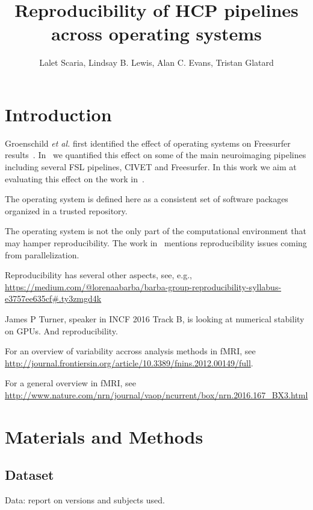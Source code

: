 \documentclass{article}
\title{Reproducibility of HCP pipelines across operating systems}
\author{Lalet Scaria, Lindsay B. Lewis, Alan C. Evans, Tristan Glatard}
\begin{document}
\maketitle


\section{Introduction}

Groenschild \emph{et al.} first identified the effect of operating
systems on Freesurfer
results~\cite{Gronenschild2012}. In~\cite{10.3389/fninf.2015.00012} we
quantified this effect on some of the main neuroimaging pipelines
including several FSL pipelines, CIVET and Freesurfer. In this work we
aim at evaluating this effect on the work in~\cite{glasser2015multi}.

The operating system is defined here as a consistent set of software
packages organized in a trusted repository.

The operating system is not the only part of the computational
environment that may hamper reproducibility. The work
in~\cite{diethelm2012limits} mentions reproducibility issues coming
from parallelization.

Reproducibility has several other aspects, see, e.g.,
\url{https://medium.com/@lorenaabarba/barba-group-reproducibility-syllabus-e3757ee635cf#.ty3zmgd4k}

James P Turner, speaker in INCF 2016 Track B, is looking at numerical stability on GPUs. And reproducibility.

For an overview of variability accross analysis methods in fMRI, see \url{http://journal.frontiersin.org/article/10.3389/fnins.2012.00149/full}.

For a general overview in fMRI, see \url{http://www.nature.com/nrn/journal/vaop/ncurrent/box/nrn.2016.167_BX3.html}

\section{Materials and Methods}

\subsection{Dataset}

Data: report on versions and subjects used.
\end{document}
